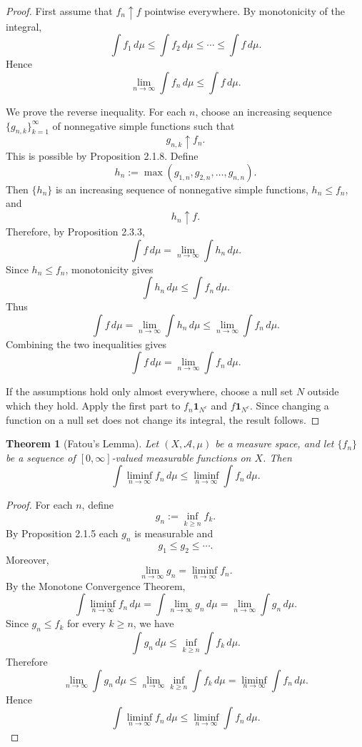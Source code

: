 \documentclass[12pt]{article}
\newtheorem{theorem}{Theorem}
\begin{document}
\begin{proof}
First assume that $f_n \uparrow f$ pointwise everywhere. By monotonicity of the
integral,
\[
\int f_1\,d\mu \le \int f_2\,d\mu \le \cdots \le \int f\,d\mu.
\]
Hence
\[
\lim_{n\to\infty}\int f_n\,d\mu \le \int f\,d\mu.
\]

We prove the reverse inequality. For each $n$, choose an increasing sequence
$\{g_{n,k}\}_{k=1}^\infty$ of nonnegative simple functions such that
\[
g_{n,k} \uparrow f_n.
\]
This is possible by Proposition 2.1.8. Define
\[
h_n := \max(g_{1,n},g_{2,n},\dots,g_{n,n}).
\]
Then $\{h_n\}$ is an increasing sequence of nonnegative simple functions,
$h_n \le f_n$, and
\[
h_n \uparrow f.
\]
Therefore, by Proposition 2.3.3,
\[
\int f\,d\mu = \lim_{n\to\infty} \int h_n\,d\mu.
\]
Since $h_n \le f_n$, monotonicity gives
\[
\int h_n\,d\mu \le \int f_n\,d\mu.
\]
Thus
\[
\int f\,d\mu
=
\lim_{n\to\infty} \int h_n\,d\mu
\le
\lim_{n\to\infty} \int f_n\,d\mu.
\]
Combining the two inequalities gives
\[
\int f\,d\mu = \lim_{n\to\infty} \int f_n\,d\mu.
\]

If the assumptions hold only almost everywhere, choose a null set $N$ outside
which they hold. Apply the first part to $f_n\mathbf{1}_{N^c}$ and
$f\mathbf{1}_{N^c}$. Since changing a function on a null set does not change its
integral, the result follows.
\end{proof}

\begin{theorem}[Fatou's Lemma]
Let $(X,\mathcal{A},\mu)$ be a measure space, and let $\{f_n\}$ be a sequence of
$[0,\infty]$-valued measurable functions on $X$. Then
\[
\int \liminf_{n\to\infty} f_n \, d\mu
\le
\liminf_{n\to\infty} \int f_n\,d\mu.
\]
\end{theorem}

\begin{proof}
For each $n$, define
\[
g_n := \inf_{k\ge n} f_k.
\]
By Proposition 2.1.5 each $g_n$ is measurable and
\[
g_1 \le g_2 \le \cdots.
\]
Moreover,
\[
\lim_{n\to\infty} g_n
=
\liminf_{n\to\infty} f_n.
\]
By the Monotone Convergence Theorem,
\[
\int \liminf_{n\to\infty} f_n\,d\mu
=
\int \lim_{n\to\infty} g_n\,d\mu
=
\lim_{n\to\infty} \int g_n\,d\mu.
\]
Since $g_n \le f_k$ for every $k\ge n$, we have
\[
\int g_n\,d\mu \le \inf_{k\ge n} \int f_k\,d\mu.
\]
Therefore
\[
\lim_{n\to\infty}\int g_n\,d\mu
\le
\lim_{n\to\infty}\inf_{k\ge n}\int f_k\,d\mu
=
\liminf_{n\to\infty}\int f_n\,d\mu.
\]
Hence
\[
\int \liminf_{n\to\infty} f_n \, d\mu
\le
\liminf_{n\to\infty} \int f_n\,d\mu.
\]
\end{proof}
\end{document}
